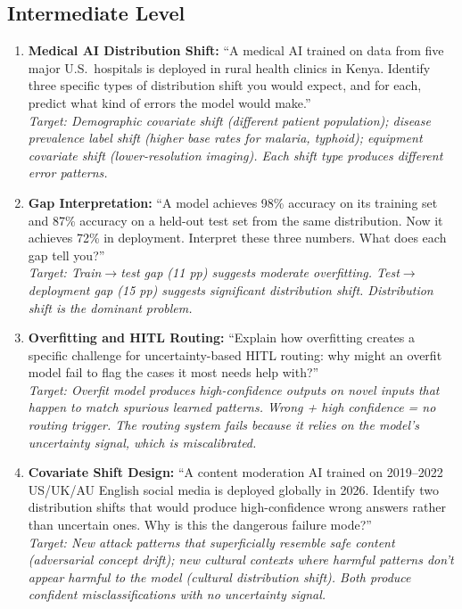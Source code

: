 \subsection{Intermediate Level}

\begin{enumerate}
    \item \textbf{Medical AI Distribution Shift:} ``A medical AI trained on data from five major U.S.\ hospitals is deployed in rural health clinics in Kenya. Identify three specific types of distribution shift you would expect, and for each, predict what kind of errors the model would make.''\\
    \textit{Target: Demographic covariate shift (different patient population); disease prevalence label shift (higher base rates for malaria, typhoid); equipment covariate shift (lower-resolution imaging). Each shift type produces different error patterns.}

    \item \textbf{Gap Interpretation:} ``A model achieves 98\% accuracy on its training set and 87\% accuracy on a held-out test set from the same distribution. Now it achieves 72\% in deployment. Interpret these three numbers. What does each gap tell you?''\\
    \textit{Target: Train$\to$test gap (11 pp) suggests moderate overfitting. Test$\to$deployment gap (15 pp) suggests significant distribution shift. Distribution shift is the dominant problem.}

    \item \textbf{Overfitting and HITL Routing:} ``Explain how overfitting creates a specific challenge for uncertainty-based HITL routing: why might an overfit model fail to flag the cases it most needs help with?''\\
    \textit{Target: Overfit model produces high-confidence outputs on novel inputs that happen to match spurious learned patterns. Wrong + high confidence = no routing trigger. The routing system fails because it relies on the model's uncertainty signal, which is miscalibrated.}

    \item \textbf{Covariate Shift Design:} ``A content moderation AI trained on 2019--2022 US/UK/AU English social media is deployed globally in 2026. Identify two distribution shifts that would produce high-confidence wrong answers rather than uncertain ones. Why is this the dangerous failure mode?''\\
    \textit{Target: New attack patterns that superficially resemble safe content (adversarial concept drift); new cultural contexts where harmful patterns don't appear harmful to the model (cultural distribution shift). Both produce confident misclassifications with no uncertainty signal.}
\end{enumerate}

